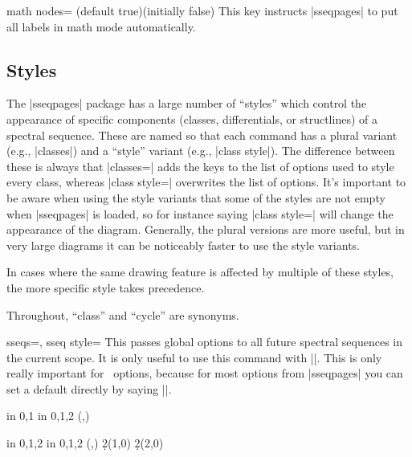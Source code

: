 \documentclass{ltxdoc}
\begin{document}
\begin{sseqdata}[name=ex1,degree={#1}{1-#1}]
\begin{key}{math nodes= (default true)(initially false)}
This key instructs |sseqpages| to put all labels in math mode automatically.
\end{key}

\subsection{Styles}
The |sseqpages| package has a large number of ``styles'' which control the appearance of specific components (classes, differentials, or structlines) of a spectral sequence. These are named so that each command has a plural variant (e.g., |classes|) and a ``style'' variant (e.g., |class style|). The difference between these is always that |classes=| adds the keys to the list of options used to style every class, whereas |class style=| overwrites the list of options. It's important to be aware when using the style variants that some of the styles are not empty when |sseqpages| is loaded, so for instance saying |class style={}| will change the appearance of the diagram. Generally, the plural versions are more useful, but in very large diagrams it can be noticeably faster to use the style variants.

In cases where the same drawing feature is affected by multiple of these styles, the more specific style takes precedence.

Throughout, ``class'' and ``cycle'' are synonyms.
\begin{keylist}{sseqs=, sseq style=}
This passes global options to all future spectral sequences in the current scope. It is only useful to use this command with |\sseqset|. This is only really important for \tikzname\ options, because for most options from |sseqpages| you can set a default directly by saying ||.
\begin{codeexample}[]
\begin{sseqpage}
\foreach \x in {0,1} \foreach \y in {0,1,2}{
    \class(\x,\y)
}
\end{sseqpage}
\hskip1cm
\begin{sseqpage}[Adams grading,classes={fill,blue}]
\foreach \x in {0,1,2} \foreach \y in {0,1,2}{
    \class(\x,\y)
}
\d2(1,0)
\d2(2,0)
\end{sseqpage}
\end{codeexample}
\end{keylist}


\end{sseqdata}
\end{document}
